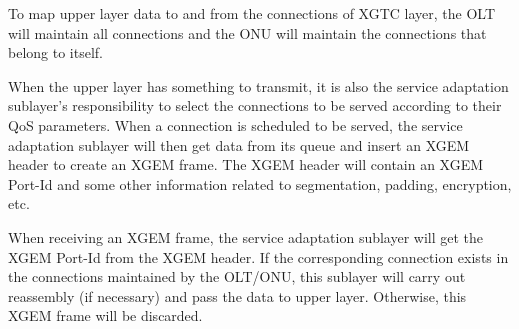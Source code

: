 To map upper layer data to and from the connections of XGTC layer,
the OLT will maintain all connections and the ONU will maintain
the connections that belong to itself.


When the upper layer has something to transmit, it is also the
service adaptation sublayer's responsibility to select the
connections to be served according to their QoS parameters. When a
connection is scheduled to be served, the service adaptation
sublayer will then get data from its queue and insert an XGEM
header to create an XGEM frame. The XGEM header will contain an
XGEM Port-Id and some other information related to segmentation,
padding, encryption, etc.

When receiving an XGEM frame, the service adaptation sublayer will
get the XGEM Port-Id from the XGEM header. If the corresponding
connection exists in the connections maintained by the OLT/ONU,
this sublayer will carry out reassembly (if necessary) and pass
the data to upper layer. Otherwise, this XGEM frame will be
discarded.















